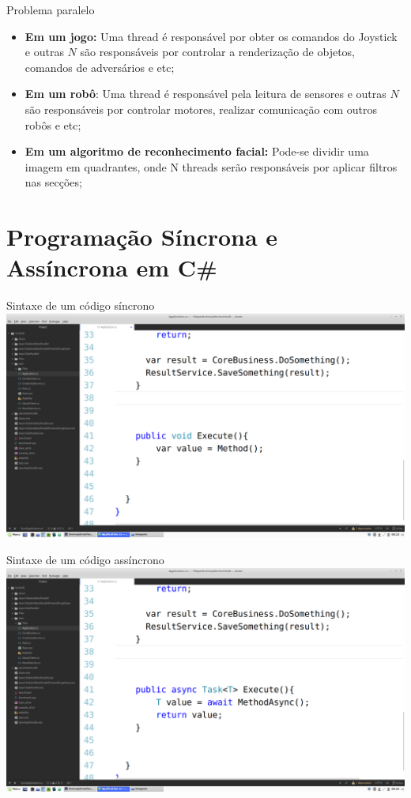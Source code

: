 \documentclass[10pt]{beamer}
\begin{document}
\begin{frame}[fragile]{Problema paralelo}
	\begin{itemize}
		\item \textbf{Em um jogo:} Uma thread é responsável por obter os comandos do Joystick e outras $N$ são responsáveis por controlar a renderização de objetos, comandos de adversários e etc;
		\vspace{0.2cm}
		\item \textbf{Em um robô}: Uma thread é responsável pela leitura de sensores e outras $N$ são responsáveis por controlar motores, realizar comunicação com outros robôs e etc;
		\vspace{0.2cm}
		\item \textbf{Em um algoritmo de reconhecimento facial:} Pode-se dividir uma imagem em quadrantes, onde N threads serão responsáveis por aplicar filtros nas secções;
	\end{itemize}
\end{frame}

\section{Programação Síncrona e Assíncrona em C\#}

\begin{frame}{Sintaxe de um código síncrono}
	\includegraphics[width=\textwidth]{imgs/00-sync.png}
\end{frame}

\begin{frame}{Sintaxe de um código assíncrono}
	\includegraphics[width=\textwidth]{imgs/01-async.png}
\end{frame}
\end{document}
